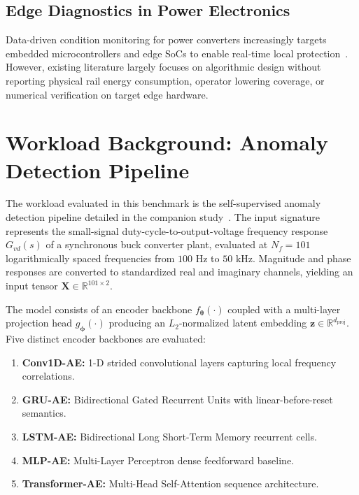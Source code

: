 \documentclass[11pt,a4paper]{article}
\begin{document}
\subsection{Edge Diagnostics in Power Electronics}
Data-driven condition monitoring for power converters increasingly targets embedded microcontrollers and edge SoCs to enable real-time local protection~\cite{gomez2024selfcommissioning,idrisov2025digitaltwin,beattie2022robust}. However, existing literature largely focuses on algorithmic design without reporting physical rail energy consumption, operator lowering coverage, or numerical verification on target edge hardware.

\section{Workload Background: Anomaly Detection Pipeline}
\label{sec:background}

The workload evaluated in this benchmark is the self-supervised anomaly detection pipeline detailed in the companion study~\cite{mmas_anomaly_detection}. The input signature represents the small-signal duty-cycle-to-output-voltage frequency response $G_{vd}(s)$ of a synchronous buck converter plant, evaluated at $N_f = 101$ logarithmically spaced frequencies from $100\text{ Hz}$ to $50\text{ kHz}$. Magnitude and phase responses are converted to standardized real and imaginary channels, yielding an input tensor $\mathbf{X} \in \mathbb{R}^{101 \times 2}$.

The model consists of an encoder backbone $f_{\boldsymbol{\theta}}(\cdot)$ coupled with a multi-layer projection head $g_{\boldsymbol{\phi}}(\cdot)$ producing an $L_2$-normalized latent embedding $\mathbf{z} \in \mathbb{R}^{d_{\mathrm{proj}}}$. Five distinct encoder backbones are evaluated:
\begin{enumerate}
    \item \textbf{Conv1D-AE:} 1-D strided convolutional layers capturing local frequency correlations.
    \item \textbf{GRU-AE:} Bidirectional Gated Recurrent Units with linear-before-reset semantics.
    \item \textbf{LSTM-AE:} Bidirectional Long Short-Term Memory recurrent cells.
    \item \textbf{MLP-AE:} Multi-Layer Perceptron dense feedforward baseline.
    \item \textbf{Transformer-AE:} Multi-Head Self-Attention sequence architecture.
\end{enumerate}
\end{document}
